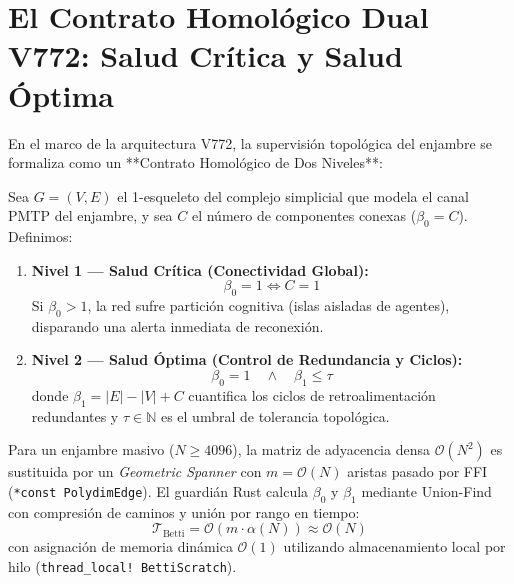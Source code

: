 \section{El Contrato Homológico Dual V772: Salud Crítica y Salud Óptima}
\label{sec:dual_betti_contract}

En el marco de la arquitectura V772, la supervisión topológica del enjambre se formaliza como un **Contrato Homológico de Dos Niveles**:

\begin{definition}
\label{def:dual_homology}
Sea $G = (V, E)$ el 1-esqueleto del complejo simplicial que modela el canal PMTP del enjambre, y sea $C$ el número de componentes conexas ($\beta_0 = C$). Definimos:
\begin{enumerate}
    \item \textbf{Nivel 1 — Salud Crítica (Conectividad Global):}
    \begin{equation}
    \beta_0 = 1 \iff C = 1
    \end{equation}
    Si $\beta_0 > 1$, la red sufre partición cognitiva (islas aisladas de agentes), disparando una alerta inmediata de reconexión.
    
    \item \textbf{Nivel 2 — Salud Óptima (Control de Redundancia y Ciclos):}
    \begin{equation}
    \beta_0 = 1 \quad \land \quad \beta_1 \le \tau
    \end{equation}
    donde $\beta_1 = |E| - |V| + C$ cuantifica los ciclos de retroalimentación redundantes y $\tau \in \mathbb{N}$ es el umbral de tolerancia topológica.
\end{enumerate}
\end{definition}

\begin{theorem}
\label{thm:spanner_betti}
Para un enjambre masivo ($N \ge 4096$), la matriz de adyacencia densa $\mathcal{O}(N^2)$ es sustituida por un \emph{Geometric Spanner} con $m = \mathcal{O}(N)$ aristas pasado por FFI (\texttt{*const PolydimEdge}). El guardián Rust calcula $\beta_0$ y $\beta_1$ mediante Union-Find con compresión de caminos y unión por rango en tiempo:
\begin{equation}
\mathcal{T}_{\text{Betti}} = \mathcal{O}(m \cdot \alpha(N)) \approx \mathcal{O}(N)
\end{equation}
con asignación de memoria dinámica $\mathcal{O}(1)$ utilizando almacenamiento local por hilo (\texttt{thread\_local! BettiScratch}).
\end{theorem}

